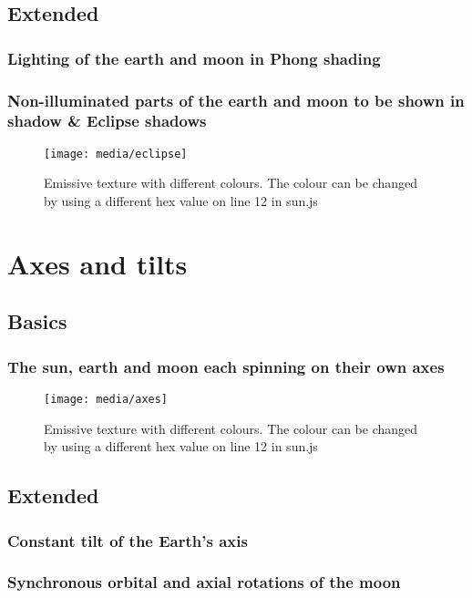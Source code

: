 \documentclass[titlepage]{article}
\begin{document}
\subsection{Extended}

\subsubsection{Lighting of the earth and moon in Phong shading}


\subsubsection{Non-illuminated parts of the earth and moon to be shown in shadow \& Eclipse shadows}


\begin{figure}[h!]
                \centering
                \texttt{[image: media/eclipse]}
                \caption{Emissive texture with different colours. The colour can be changed by using a different hex value on line 12 in sun.js}
\end{figure}
\medskip

\section{Axes and tilts}

\subsection{Basics}
\subsubsection{The sun, earth and moon each spinning on their own axes}
\begin{figure}[h!]
                \centering
                \texttt{[image: media/axes]}
                \caption{Emissive texture with different colours. The colour can be changed by using a different hex value on line 12 in sun.js}
\end{figure}
\subsection{Extended}
\subsubsection{Constant tilt of the Earth’s axis}
\subsubsection{Synchronous orbital and axial rotations of the moon}
\end{document}
